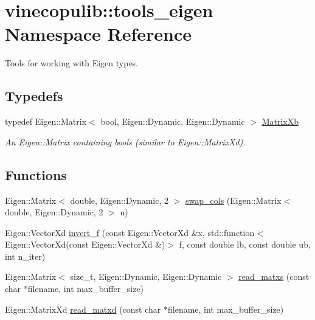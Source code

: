 \hypertarget{namespacevinecopulib_1_1tools__eigen}{}\section{vinecopulib\+:\+:tools\+\_\+eigen Namespace Reference}
\label{namespacevinecopulib_1_1tools__eigen}


Tools for working with Eigen types.  


\subsection*{Typedefs}
\begin{DoxyCompactItemize}
\item 
typedef Eigen\+::\+Matrix$<$ bool, Eigen\+::\+Dynamic, Eigen\+::\+Dynamic $>$ \hyperlink{namespacevinecopulib_1_1tools__eigen_a2fcd63009df35741859f44f1e41931f9}{Matrix\+Xb}\hypertarget{namespacevinecopulib_1_1tools__eigen_a2fcd63009df35741859f44f1e41931f9}{}\label{namespacevinecopulib_1_1tools__eigen_a2fcd63009df35741859f44f1e41931f9}

\begin{DoxyCompactList}\small\item\em An {\ttfamily Eigen\+::\+Matrix} containing {\ttfamily bool}s (similar to {\ttfamily Eigen\+::\+Matrix\+Xd}). \end{DoxyCompactList}\end{DoxyCompactItemize}
\subsection*{Functions}
\begin{DoxyCompactItemize}
\item 
Eigen\+::\+Matrix$<$ double, Eigen\+::\+Dynamic, 2 $>$ \hyperlink{namespacevinecopulib_1_1tools__eigen_a87f5c90d47fb6baffc84ad28a82d8f0e}{swap\+\_\+cols} (Eigen\+::\+Matrix$<$ double, Eigen\+::\+Dynamic, 2 $>$ u)
\item 
Eigen\+::\+Vector\+Xd \hyperlink{namespacevinecopulib_1_1tools__eigen_a164995419e7e473fc4cec081ce4bcb85}{invert\+\_\+f} (const Eigen\+::\+Vector\+Xd \&x, std\+::function$<$ Eigen\+::\+Vector\+Xd(const Eigen\+::\+Vector\+Xd \&)$>$ f, const double lb, const double ub, int n\+\_\+iter)
\item 
Eigen\+::\+Matrix$<$ size\+\_\+t, Eigen\+::\+Dynamic, Eigen\+::\+Dynamic $>$ \hyperlink{namespacevinecopulib_1_1tools__eigen_ac9f84f6a2e75bf8b559e5b0845abd782}{read\+\_\+matxs} (const char $\ast$filename, int max\+\_\+buffer\+\_\+size)
\item 
Eigen\+::\+Matrix\+Xd \hyperlink{namespacevinecopulib_1_1tools__eigen_adccba44df8156221d52f2d9ffbe321de}{read\+\_\+matxd} (const char $\ast$filename, int max\+\_\+buffer\+\_\+size)
\end{DoxyCompactItemize}


